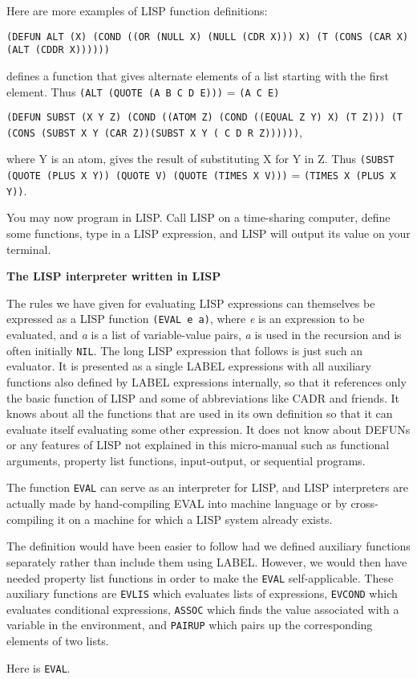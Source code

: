 \documentclass[10pt,a4paper,twocolumn]{article}
\begin{document}
Here are more examples of LISP function definitions:

\texttt{(DEFUN ALT (X) (COND ((OR (NULL X) (NULL (CDR X))) X) (T (CONS (CAR X)
  (ALT (CDDR X))))))}

defines a function that gives alternate elements of a list starting with the
first element. Thus \texttt{(ALT (QUOTE (A B C D E)))} = \texttt{(A C E)}

\texttt{(DEFUN SUBST (X Y Z) (COND ((ATOM Z) (COND ((EQUAL Z Y) X) (T Z))) (T
  (CONS (SUBST X Y (CAR Z))(SUBST X Y ( C D R Z))))))},

where Y is an atom, gives the result of substituting X for Y in Z. Thus
\texttt{(SUBST (QUOTE (PLUS X Y)) (QUOTE V) (QUOTE (TIMES X V)))} =
\texttt{(TIMES X (PLUS X Y))}.

You may now program in LISP. Call LISP on a time-sharing computer, define some
functions, type in a LISP expression, and LISP will output its value on your
terminal.

\vspace*{1\baselineskip}
\textbf{The LISP interpreter written in LISP}
\vspace*{1\baselineskip}

The rules we have given for evaluating LISP expressions can themselves be
expressed as a LISP function \texttt{(EVAL e a)}, where \textit{e} is an
expression to be evaluated, and \textit{a} is a list of variable-value pairs,
\textit{a} is used in the recursion and is often initially \texttt{NIL}. The
long LISP expression that follows is just such an evaluator. It is presented as
a single LABEL expressions with all auxiliary functions also defined by LABEL
expressions internally, so that it references only the basic function of LISP
and some of abbreviations like CADR and friends. It knows about all the
functions that are used in its own definition so that it can evaluate itself
evaluating some other expression. It does not know about DEFUNs or any features
of LISP not explained in this micro-manual such as functional arguments,
property list functions, input-output, or sequential programs.

The function \texttt{EVAL} can serve as an interpreter for LISP, and LISP
interpreters are actually made by hand-compiling EVAL into machine language or
by cross-compiling it on a machine for which a LISP system already exists.

The definition would have been easier to follow had we defined auxiliary
functions separately rather than include them using LABEL. However, we would
then have needed property list functions in order to make the \texttt{EVAL}
self-applicable. These auxiliary functions are \texttt{EVLIS} which evaluates
lists of expressions, \texttt{EVCOND} which evaluates conditional expressions,
\texttt{ASSOC} which finds the value associated with a variable in the
environment, and \texttt{PAIRUP} which pairs up the corresponding elements of
two lists.

Here is \texttt{EVAL}.

\end{document}

